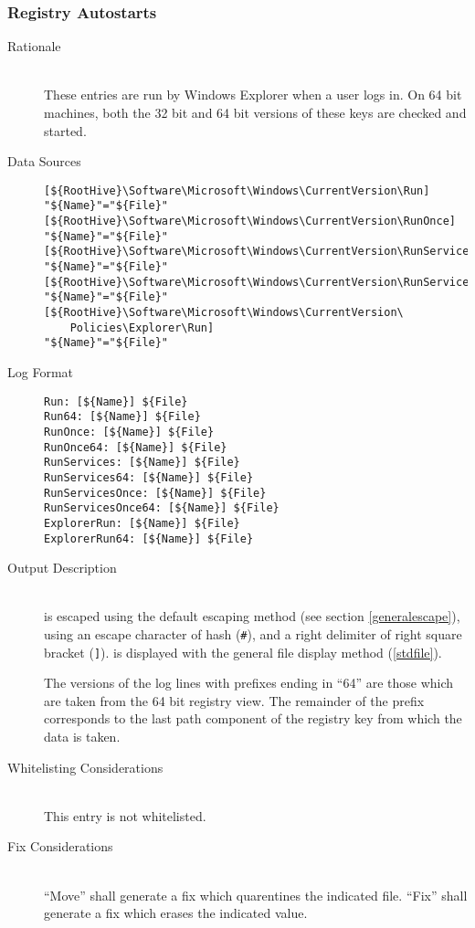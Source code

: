 \subsubsection{Registry Autostarts}
\begin{description}
\item[Rationale] \hfill \\
These entries are run by Windows Explorer when a user logs in. On 64 bit
machines, both the 32 bit and 64 bit versions of these keys are checked and
started.
\item[Data Sources] \hfill
\vspace{-\baselineskip}
\begin{verbatim}
[${RootHive}\Software\Microsoft\Windows\CurrentVersion\Run]
"${Name}"="${File}"
[${RootHive}\Software\Microsoft\Windows\CurrentVersion\RunOnce]
"${Name}"="${File}"
[${RootHive}\Software\Microsoft\Windows\CurrentVersion\RunServices]
"${Name}"="${File}"
[${RootHive}\Software\Microsoft\Windows\CurrentVersion\RunServicesOnce]
"${Name}"="${File}"
[${RootHive}\Software\Microsoft\Windows\CurrentVersion\
    Policies\Explorer\Run]
"${Name}"="${File}"
\end{verbatim}
\item[Log Format] \hfill
\vspace{-\baselineskip}
\begin{verbatim}
Run: [${Name}] ${File}
Run64: [${Name}] ${File}
RunOnce: [${Name}] ${File}
RunOnce64: [${Name}] ${File}
RunServices: [${Name}] ${File}
RunServices64: [${Name}] ${File}
RunServicesOnce: [${Name}] ${File}
RunServicesOnce64: [${Name}] ${File}
ExplorerRun: [${Name}] ${File}
ExplorerRun64: [${Name}] ${File}
\end{verbatim}
\item[Output Description] \hfill \\
 is escaped using the default escaping method (see section
\ref{generalescape}), using an escape character of hash (\verb|#|), and a right
delimiter of right square bracket (\verb|]|). \var{File} is displayed with the
general file display method (\ref{stdfile}).

The versions of the log lines with prefixes ending in ``64'' are those which are
taken from the 64 bit registry view. The remainder of the prefix corresponds to
the last path component of the registry key from which the data is taken.
\item[Whitelisting Considerations] \hfill \\
This entry is not whitelisted.
\item[Fix Considerations] \hfill \\
``Move'' shall generate a fix which quarentines the indicated file. ``Fix''
shall generate a fix which erases the indicated value.
\end{description}

